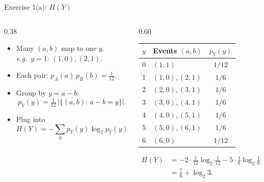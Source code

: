 \documentclass[aspectratio=169]{beamer}
\newcommand{\etpy}{H(Y)}
\begin{document}
\begin{frame}{Exercise 1(a): $H(Y)$}
\setlength{\abovedisplayskip}{3pt}
\setlength{\belowdisplayskip}{3pt}
\begin{columns}[T,totalwidth=\textwidth]
	\begin{column}{0.38\textwidth}
		\small
		\begin{itemize}
			\item Many $(a,b)$ map to one $y$. \\
			      \emph{e.g.}\ $y{=}1$: $(1,0),(2,1)$.
			\item Each pair: $p_A(a)\,p_B(b)=\tfrac{1}{12}$.
			\item Group by $y{=}a{-}b$:
			\[
				p_Y(y) = \tfrac{1}{12}\,|\{(a,b):\, a{-}b{=}y\}|.
			\]
			\item Plug into
			\[
				\etpy = -\!\sum_y p_Y(y) \log_2 p_Y(y).
			\]
		\end{itemize}
	\end{column}
	\begin{column}{0.60\textwidth}
		\begin{center}
		\small
		\renewcommand{\arraystretch}{1.05}
			\begin{tabular}{c l c}
				\hline
				$y$ & Events $(a,b)$ & $p_Y(y)$ \\
				\hline
				0 & $(1, 1)$	 & $1/12$ \\
				1 & $(1, 0), (2, 1)$	 & $1/6$ \\
				2 & $(2, 0), (3, 1)$	 & $1/6$ \\
				3 & $(3, 0), (4, 1)$	 & $1/6$ \\
				4 & $(4, 0), (5, 1)$	 & $1/6$ \\
				5 & $(5, 0), (6, 1)$	 & $1/6$ \\
				6 & $(6, 0)$	 & $1/12$ \\
				\hline
			\end{tabular}
		\end{center}
		\small
		\[
		\begin{aligned}
			\etpy &= -2 \cdot \tfrac{1}{12} \log_2 \tfrac{1}{12} - 5 \cdot \tfrac{1}{6} \log_2 \tfrac{1}{6} \\
			      &= \tfrac{7}{6} + \log_2 3.
		\end{aligned}
		\]
	\end{column}
\end{columns}
\end{frame}
\end{document}
